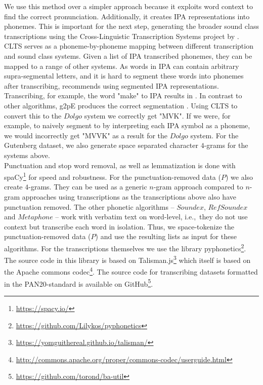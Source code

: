 We use this method over a simpler approach because it exploits word context to find the correct pronunciation.
Additionally, it creates IPA representations  into phonemes.
This is important for the next step, generating the broader sound class transcriptions using the Cross-Linguistic Transcription Systems project by \cite{list2018cltsIntro}.
CLTS serves as a phoneme-by-phoneme mapping between different transcription and sound class systems.
Given a list of IPA transcribed phonemes, they can be mapped to a range of other systems.
As words in IPA can contain arbitrary supra-segmental letters, and it is hard to segment these words into phonemes after transcribing, \cite{list2018sequence} recommends using segmented IPA representations.
Transcribing, for example, the word "make" to IPA results in \textipa{[meIk]}.
In contrast to other algorithms, g2pE produces the correct segmentation \textipa{[m eI k]}.
Using CLTS to convert this to the $Dolgo$ system we correctly get "MVK".
If we were, for example, to naively segment \textipa{[meIk]} to \textipa{[m e I k]} by interpreting each IPA symbol as a phoneme, we would incorrectly get "MVVK" as a result for the $Dolgo$ system.
For the Gutenberg dataset, we also generate space separated character $4$-grams for the systems above.\\
Punctuation and stop word removal, as well as lemmatization is done with spaCy\footnote{\url{https://spacy.io/}} for speed and robustness.
For the punctuation-removed data ($P$) we also create $4$-grams.
They can be used as a generic $n$-gram approach compared to $n$-gram approaches using transcriptions as the transcriptions above also have punctuation removed.
The other phonetic algorithms -- $Soundex$, $RefSoundex$ and $Metaphone$ -- work with verbatim text on word-level, i.e.,\ they do not use context but transcribe each word in isolation.
Thus, we space-tokenize the punctuation-removed data ($P$) and use the resulting lists as input for these algorithms.
For the transcriptions themselves we use the library pyphonetics\footnote{\url{https://github.com/Lilykos/pyphonetics}}.
The source code in this library is based on Talisman.js\footnote{\url{https://yomguithereal.github.io/talisman/}} which itself is based on the Apache commons codec\footnote{\url{http://commons.apache.org/proper/commons-codec/userguide.html}}.
The source code for transcribing datasets formatted in the PAN20-standard is available on GitHub\footnote{\url{https://github.com/torond/ba-util}}.

